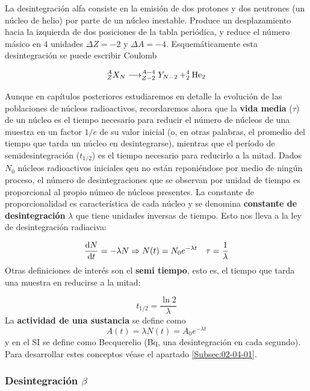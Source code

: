 La desintegración alfa consiste en la emisión de dos protones y dos neutrones (un núcleo de helio) por parte de un núcleo inestable. Produce un desplazamiento hacia la izquierda de dos posiciones de la tabla periódica, y reduce el número másico en 4 unidades $\Delta Z = -2$ y $\Delta A  = -4$. Esquemáticamente esta desintegración se puede escribir Coulomb

\begin{equation}
	^A_Z X_N \longrightarrow ^{A-4}_{Z-2} Y_{N-2} + ^4_2\text{He}_2
\end{equation}

Aunque en capítulos posteriores estudiaremos en detalle la evolución de las poblaciones de núcleos radioactivos, recordaremos ahora que la \textbf{vida media} ($\tau$) de un núcleo es el tiempo necesario para reducir el número de núcleos de una muestra en un factor $1/e$ de su valor inicial (o, en otras palabras, el promedio del tiempo que tarda un núcleo en desintegrarse), mientras que el período de semidesintegración ($t_{1/2}$) es el tiempo necesario para reducirlo a la mitad. Dados $N_0$ núcleos radioactivos iniciales qeu no están reponiéndose por medio de ningún proceso, el número de desintegraciones que se observan por unidad de tiempo es proporcional al propio númeo de núcleos presentes. La constante de proporcionalidad es característica de cada núcleo y se denomina \textbf{constante de desintegración} $\lambda$ que tiene unidades inversas de tiempo. Esto nos lleva a la ley de desintegración radiaciva:

\begin{equation}
	\frac{\mathrm{d} N}{\mathrm{d} t} = - \lambda N \Rightarrow N (t)  = N_0 e^{-\lambda t} \quad \tau = \frac{1}{\lambda}
\end{equation}
Otras definiciones de interés son el \textbf{semi tiempo}, esto es, el tiempo que tarda una muestra en reducirse a la mitad:

\begin{equation}
	t_{1/2} = \frac{\ln 2}{\lambda}
\end{equation}
La \textbf{actividad de una sustancia} se define como
\begin{equation}
	A(t)=\lambda N(t)  = A_0 e^{-\lambda t}
\end{equation}
y en el SI se define como Becquerelio (Bq, una desintegración en cada segundo). Para desarrollar estes conceptos véase el apartado \ref{Subsec:02-04-01}.

\subsubsection{Desintegración $\beta$}

